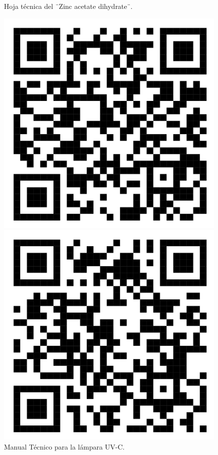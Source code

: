 \documentclass[12pt]{article}
\begin{document}
\begin{figure}[htbp]
\begin{minipage}{0.4\textwidth}
    \caption{Hoja técnica del ¨Zinc acetate dihydrate¨.}
    \label{fig:imagen4}
  \end{minipage}
\end{figure}

 \begin{figure}[htbp]
  \begin{minipage}{0.4\textwidth}
    \centering
    \includegraphics[width=\linewidth]
    {Imagenes/Manual_UV.png}
    \caption{Manual Técnico para la lámpara UV-C.}
    \label{fig:Manual_UV}
  \end{minipage}\hfill
  \begin{minipage}{0.4\textwidth}
    \centering
    \includegraphics[width=\linewidth]{Imagenes/R6G_QR.png}

\end{minipage}
\end{figure}
\end{document}
